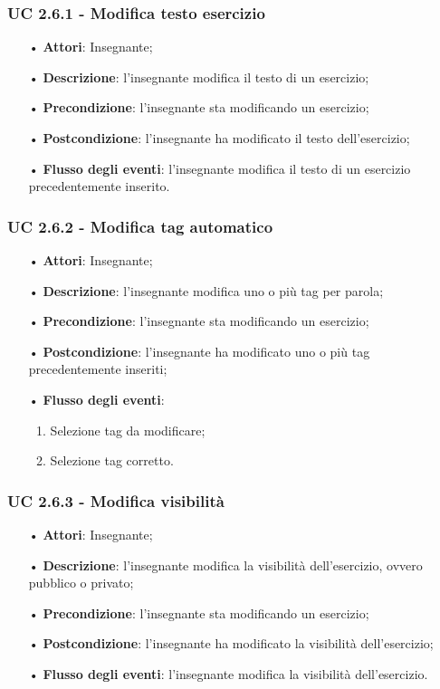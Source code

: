 \subsubsection{UC 2.6.1 - Modifica testo esercizio}
\begin{itemize}
	\item[•] \textbf{Attori}: Insegnante;
	\item[•] \textbf{Descrizione}: l'insegnante modifica il testo di un esercizio;
	\item[•] \textbf{Precondizione}: l'insegnante sta modificando un esercizio;
	\item[•] \textbf{Postcondizione}: l'insegnante ha modificato il testo dell'esercizio;
	\item[•] \textbf{Flusso degli eventi}: l'insegnante modifica il testo di un esercizio precedentemente inserito.
\end{itemize}


\subsubsection{UC 2.6.2 - Modifica tag automatico}
\begin{itemize}
	\item[•] \textbf{Attori}: Insegnante;
	\item[•] \textbf{Descrizione}: l'insegnante modifica uno o più tag per parola;
	\item[•] \textbf{Precondizione}: l'insegnante sta modificando un esercizio;
	\item[•] \textbf{Postcondizione}: l'insegnante ha modificato uno o più tag precedentemente inseriti;
\item[•] \textbf{Flusso degli eventi}:
\begin{enumerate}
		\item Selezione tag da modificare;
		\item Selezione tag corretto.
\end{enumerate}
\end{itemize}


\subsubsection{UC 2.6.3 - Modifica visibilità} 
\begin{itemize}
	\item[•] \textbf{Attori}: Insegnante;
	\item[•] \textbf{Descrizione}: l'insegnante modifica la visibilità dell'esercizio, ovvero pubblico o privato;
	\item[•] \textbf{Precondizione}: l'insegnante sta modificando un esercizio;
	\item[•] \textbf{Postcondizione}: l'insegnante ha modificato la visibilità dell'esercizio;
	\item[•] \textbf{Flusso degli eventi}: l'insegnante modifica la visibilità dell'esercizio.
\end{itemize}


